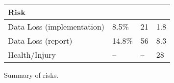 \begin{figure}
\begin{tabu} to 0.9\linewidth { X[7,r] | X[c] | X[c] | X[c] }
  \textbf{Risk} &  &
     &  \\
    \hline
    Data Loss (implementation) & 8.5\%
                               & 21
                               & 1.8 \\
    Data Loss (report) & 14.8\%
                       & 56
                       & 8.3 \\
    Health/Injury & --
                  & --
                  & 28
\end{tabu}
\caption{Summary of risks.}
\label{fig:risks}
\end{figure}

